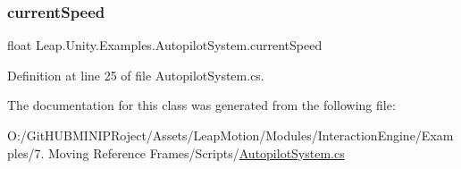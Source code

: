 \subsubsection{\texorpdfstring{currentSpeed}{currentSpeed}}
{\footnotesize\ttfamily float Leap.\+Unity.\+Examples.\+Autopilot\+System.\+current\+Speed\hspace{0.3cm}{\ttfamily [get]}}



Definition at line 25 of file Autopilot\+System.\+cs.



The documentation for this class was generated from the following file\+:\begin{DoxyCompactItemize}
\item 
O\+:/\+Git\+H\+U\+B\+M\+I\+N\+I\+P\+Roject/\+Assets/\+Leap\+Motion/\+Modules/\+Interaction\+Engine/\+Examples/7. Moving Reference Frames/\+Scripts/\mbox{\hyperlink{_autopilot_system_8cs}{Autopilot\+System.\+cs}}\end{DoxyCompactItemize}
